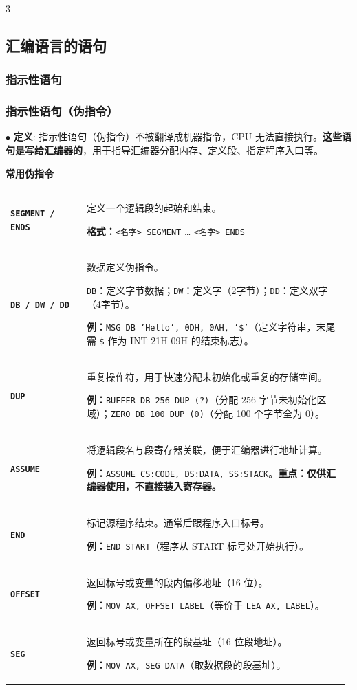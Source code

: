 \documentclass[10pt, a4paper, landscape]{article}
\makeatletter
\newcommand{\red}[1]{\textbf{\textcolor{myred}{#1}}}
\newcommand{\blue}[1]{\textbf{\textcolor{myblue}{#1}}}
\newcommand{\entry}[2]{$\bullet$ \textbf{#1}: #2\par\vspace{0.5pt}}
\newcommand{\cbox}[2][yellow]{\begingroup\setlength{\fboxsep}{1pt}\colorbox{#1}{\strut#2}\endgroup}
\newcommand{\hlblue}[1]{\cbox[hlblue]{#1}}
\newcommand{\concepttable}[1]{%
    {\setlength{\tabcolsep}{1.5pt}%
     \renewcommand{\arraystretch}{0.92}%
     \par\vspace{2pt}{\color{myblue}\hrule height 0.6pt}\vspace{1pt}%
     \noindent\begin{tabular}{@{}p{0.22\linewidth}p{0.76\linewidth}@{}}%
     #1%
     \end{tabular}%
     \vspace{1pt}{\color{myblue}\hrule height 0.6pt}\par\vspace{2pt}}%
}
\newcommand{\conrow}[2]{\blue{#1} & #2 \\}
\makeatother
\begin{document}
\begin{multicols*}{3}
\subsection{汇编语言的语句}

\subsubsection{指示性语句}

\subsubsection{指示性语句（伪指令）}

\entry{定义}{
    指示性语句（伪指令）不被翻译成机器指令，CPU 无法直接执行。\red{这些语句是写给汇编器的}，用于指导汇编器分配内存、定义段、指定程序入口等。
}

\hlblue{\textbf{常用伪指令}}

\concepttable{
    \conrow{\texttt{SEGMENT / ENDS}}{
        定义一个逻辑段的起始和结束。\par
        \textbf{格式：}\texttt{<名字> SEGMENT} \quad … \quad \texttt{<名字> ENDS}
    }
    \conrow{\texttt{DB / DW / DD}}{
        数据定义伪指令。\par
        \texttt{DB}：定义字节数据；\texttt{DW}：定义字（2字节）；\texttt{DD}：定义双字（4字节）。\par
        \textbf{例：}\texttt{MSG DB 'Hello', 0DH, 0AH, '\$'}（定义字符串，末尾需 \texttt{\$} 作为 INT 21H 09H 的结束标志）。
    }
    \conrow{\texttt{DUP}}{
        重复操作符，用于快速分配未初始化或重复的存储空间。\par
        \textbf{例：}\texttt{BUFFER DB 256 DUP (?)}（分配 256 字节未初始化区域）；\texttt{ZERO DB 100 DUP (0)}（分配 100 个字节全为 0）。
    }
    \conrow{\texttt{ASSUME}}{
        将逻辑段名与段寄存器关联，便于汇编器进行地址计算。\par
        \textbf{例：}\texttt{ASSUME CS:CODE, DS:DATA, SS:STACK}。\red{重点：仅供汇编器使用，不直接装入寄存器。}
    }
    \conrow{\texttt{END}}{
        标记源程序结束。通常后跟程序入口标号。\par
        \textbf{例：}\texttt{END START}（程序从 START 标号处开始执行）。
    }
    \conrow{\texttt{OFFSET}}{
        返回标号或变量的段内偏移地址（16 位）。\par
        \textbf{例：}\texttt{MOV AX, OFFSET LABEL}（等价于 \texttt{LEA AX, LABEL}）。
    }
    \conrow{\texttt{SEG}}{
        返回标号或变量所在的段基址（16 位段地址）。\par
        \textbf{例：}\texttt{MOV AX, SEG DATA}（取数据段的段基址）。
    }
}


\end{multicols*}
\end{document}
